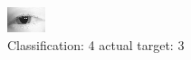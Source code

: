 \begin{figure}[h!]
\begin{center}
\includegraphics[width=0.60\columnwidth]{figures/ID91_class_4_target_3.png}
\end{center}
\caption{ Classification: 4 actual target: 3}
\label{fig:ID91_class_4_target_3}
\end{figure}

